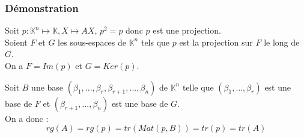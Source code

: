 \documentclass[a4paper,10pt]{book} %
\newcommand{\K}{\mathbb{K}}
\begin{document}
\subsubsection{Démonstration}
Soit $p:\mathbb{K}^n \mapsto \mathbb{K},X\mapsto AX$, $p^2=p$ donc $p$ est une projection.\\
Soient $F$ et $G$ les sous-espaces de $\K^n$ tels que $p$ est la projection sur $F$ le long de $G$.\\

On a $F=Im(p)$ et $G=Ker(p)$.

Soit $B$ une base $(\beta_{1},...,\beta_{r},\beta_{r+1},...,\beta_{n})$ de $\K^n$ telle que $(\beta_{1},...,\beta_{r})$ est une base de $F$ et $(\beta_{r+1},...,\beta_{n})$ est une base de $G$.\\

On a donc :
$$rg(A)=rg(p)=tr(Mat(p,B))=tr(p)=tr(A)$$
\end{document}
